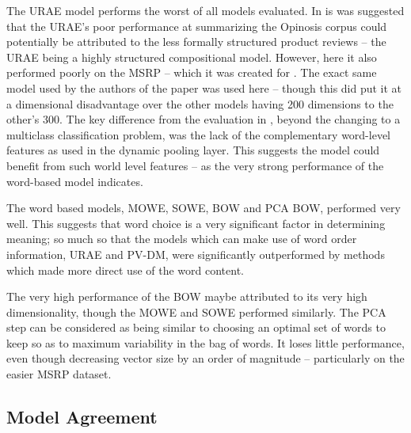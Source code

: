 \documentclass[]{book}
\begin{document}
The URAE model performs the worst of all models evaluated. In \citep{KaagebExtractiveSummaristation}
is was suggested that the URAE's poor performance at summarizing the
Opinosis corpus could potentially be attributed to the less formally
structured product reviews -- the URAE being a highly structured compositional
model. However, here it also performed poorly on the MSRP -- which
it was created for \citet{SocherEtAl2011:PoolRAE}. The exact same
model used by the authors of the paper was used here -- though
this did put it at a dimensional disadvantage over the other models
having 200 dimensions to the other's 300. The key difference from
the evaluation in \citet{SocherEtAl2011:PoolRAE}, beyond the changing to a multiclass
classification problem, was the lack of the complementary word-level
features as used in the dynamic pooling layer. This suggests the model
could benefit from such world level features -- as the very strong
performance of the word-based model indicates.

The word based models, MOWE, SOWE, BOW and PCA BOW, performed very
well. This suggests that word choice is a very significant factor
in determining meaning; so much so that the models which can make
use of word order information, URAE and PV-DM, were significantly
outperformed by methods which made more direct use of the word content. 

The very high performance of the BOW maybe attributed to its very
high dimensionality, though the MOWE and SOWE performed similarly.
The PCA step can be considered as being similar to choosing an optimal
set of words to keep so as to maximum variability in the bag of words.
It loses little performance, even though decreasing vector size by
an order of magnitude -- particularly on the easier MSRP dataset.


\subsection{Model Agreement}
\end{document}

